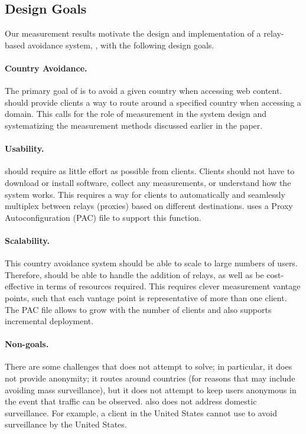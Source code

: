 \subsection{Design Goals}
\label{goals}

Our measurement results motivate 
 the design and implementation of a relay-based avoidance system,
\system{}, with the following design goals.

\paragraph{Country Avoidance.}  The primary goal of \system{} is to
avoid a given country when accessing web content.  \system{} should
provide clients a way to route around a specified country when
accessing a domain.  This calls for the role of measurement in the
system design and systematizing the measurement methods discussed
earlier in the paper.

\paragraph{Usability.} \system{} should require as little effort as
possible from clients.  Clients should not have to download
or install software, collect any measurements, or understand how the
system works.  This requires a way for clients to automatically and
seamlessly multiplex between relays (proxies) based on different
destinations.  \system{} uses a Proxy Autoconfiguration (PAC) file to support this
function.

\paragraph{Scalability.}  This country avoidance system should be able to scale to 
large numbers of users.  Therefore, \system{} should be able to handle the addition
 of relays, as well as be cost-effective in terms of resources required. This requires 
clever measurement vantage points, such that each vantage point is representative of 
more than one client.  The PAC file allows \system{} to 
grow with the number of clients and also supports incremental deployment.

\paragraph{Non-goals.}  There are some challenges that \system{} does not
attempt to  solve; in particular, it does not provide anonymity; it routes
around  countries (for reasons that may include avoiding mass surveillance),
but it does not attempt to keep users anonymous in the event that traffic can
be observed.   \system{} also does not address domestic surveillance. For
example, a client in the United States cannot use \system{} to avoid surveillance 
by the United States. 

